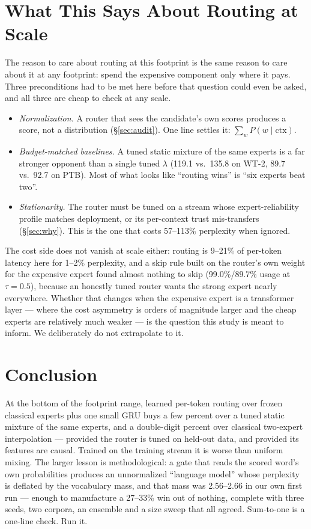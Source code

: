 \documentclass[11pt]{article}
\begin{document}
\section{What This Says About Routing at Scale}
\label{sec:scale}

The reason to care about routing at this footprint is the same reason to care
about it at any footprint: spend the expensive component only where it pays.
Three preconditions had to be met here before that question could even be asked,
and all three are cheap to check at any scale.
\begin{itemize}\itemsep0pt
\item \emph{Normalization.} A router that sees the candidate's own scores
  produces a score, not a distribution (\S\ref{sec:audit}). One line settles
  it: $\sum_w P(w\mid\mathrm{ctx})$.
\item \emph{Budget-matched baselines.} A tuned static mixture of the same
  experts is a far stronger opponent than a single tuned $\lambda$ (119.1 vs.\
  135.8 on WT-2, 89.7 vs.\ 92.7 on PTB). Most of what looks like ``routing
  wins'' is ``six experts beat two''.
\item \emph{Stationarity.} The router must be tuned on a stream whose
  expert-reliability profile matches deployment, or its per-context trust
  mis-transfers (\S\ref{sec:why}). This is the one that costs 57--113\%
  perplexity when ignored.
\end{itemize}
The cost side does not vanish at scale either: routing is 9--21\% of per-token
latency here for 1--2\% perplexity, and a skip rule built on the router's own
weight for the expensive expert found almost nothing to skip (99.0\%/89.7\%
usage at $\tau=0.5$), because an honestly tuned router wants the strong expert
nearly everywhere. Whether that changes when the expensive expert is a
transformer layer --- where the cost asymmetry is orders of magnitude larger and
the cheap experts are relatively much weaker --- is the question this study is
meant to inform. We deliberately do not extrapolate to it.

\section{Conclusion}

At the bottom of the footprint range, learned per-token routing over frozen
classical experts plus one small GRU buys a few percent over a tuned static
mixture of the same experts, and a double-digit percent over classical
two-expert interpolation --- provided the router is tuned on held-out data, and
provided its features are causal. Trained on the training stream it is worse
than uniform mixing. The larger lesson is methodological: a gate that reads the
scored word's own probabilities produces an unnormalized ``language model''
whose perplexity is deflated by the vocabulary mass, and that mass was 2.56--2.66
in our own first run --- enough to manufacture a 27--33\% win out of nothing,
complete with three seeds, two corpora, an ensemble and a size sweep that all
agreed. Sum-to-one is a one-line check. Run it.
\end{document}
